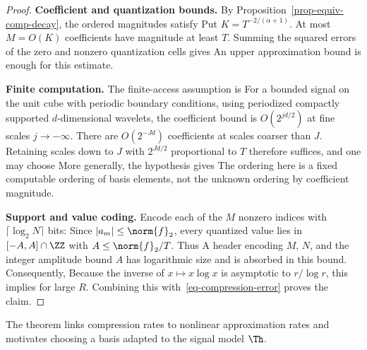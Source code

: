 \begin{proof}
\par\smallskip\noindent\textbf{Coefficient and quantization bounds.}\quad
By Proposition~\ref{prop-equiv-comp-decay}, the ordered magnitudes satisfy
Put $K=T^{-2/(\alpha+1)}$. At most $M=O(K)$ coefficients have magnitude at least $T$. Summing the squared errors of the zero and nonzero quantization cells gives
An upper approximation bound is enough for this estimate.

\par\smallskip\noindent\textbf{Finite computation.}\quad
The finite-access assumption is
For a bounded signal on the unit cube with periodic boundary conditions, using periodized compactly supported $d$-dimensional wavelets, the coefficient bound is $O(2^{jd/2})$ at fine scales $j\to-\infty$. There are $O(2^{-Jd})$ coefficients at scales coarser than $J$. Retaining scales down to $J$ with $2^{Jd/2}$ proportional to $T$ therefore suffices, and one may choose
More generally, the hypothesis gives
The ordering here is a fixed computable ordering of basis elements, not the unknown ordering by coefficient magnitude.

\par\smallskip\noindent\textbf{Support and value coding.}\quad
Encode each of the $M$ nonzero indices with $\lceil\log_2N\rceil$ bits:
Since $|a_m|\leq\norm{f}_2$, every quantized value lies in $[-A,A]\cap\ZZ$ with $A\leq\norm{f}_2/T$. Thus
A header encoding $M$, $N$, and the integer amplitude bound $A$ has logarithmic size and is absorbed in this bound. Consequently,
Because the inverse of $x\mapsto x\log x$ is asymptotic to $r/\log r$, this implies
for large $R$. Combining this with~\eqref{eq-compression-error} proves the claim.
\end{proof}


The theorem links compression rates to nonlinear approximation rates and motivates choosing a basis adapted to the signal model $\Th$.
 
